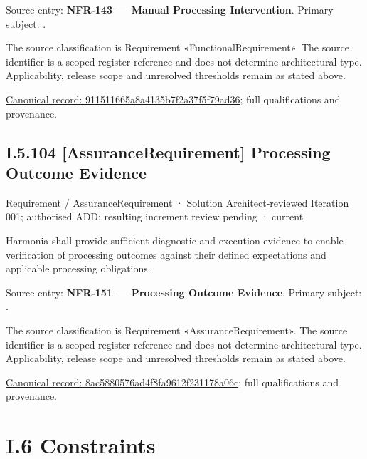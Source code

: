 Source entry: \textbf{NFR-143 — Manual Processing Intervention}. Primary subject: \texttt{}.



The source classification is Requirement «FunctionalRequirement». The source identifier is a scoped register reference and does not determine architectural type. Applicability, release scope and unresolved thresholds remain as stated above.


{\footnotesize \href{../../../../continuum/motivation/requirement/functional-requirement/911511665a8a4135b7f2a37f5f79ad36.md}{Canonical record: 911511665a8a4135b7f2a37f5f79ad36}; full qualifications and provenance.}\par
\section*{I.5.104 [AssuranceRequirement] Processing Outcome Evidence}
\label{navigation:I.5.104}

\label{element:8ac5880576ad4f8fa9612f231178a06c}
{\small Requirement / AssuranceRequirement · Solution Architect-reviewed Iteration 001; authorised ADD; resulting increment review pending · current}\par

Harmonia shall provide sufficient diagnostic and execution evidence to enable verification of processing outcomes against their defined expectations and applicable processing obligations.



Source entry: \textbf{NFR-151 — Processing Outcome Evidence}. Primary subject: \texttt{}.



The source classification is Requirement «AssuranceRequirement». The source identifier is a scoped register reference and does not determine architectural type. Applicability, release scope and unresolved thresholds remain as stated above.


{\footnotesize \href{../../../../continuum/motivation/requirement/assurance-requirement/8ac5880576ad4f8fa9612f231178a06c.md}{Canonical record: 8ac5880576ad4f8fa9612f231178a06c}; full qualifications and provenance.}\par
\chapter*{I.6 Constraints}
\label{navigation:I.6}


